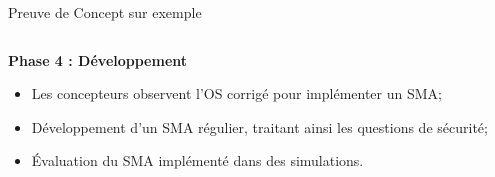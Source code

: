     \begin{frame}[fragile]{Preuve de Concept sur exemple}
    
    \begin{columns}
    
        \begin{column}{0.6\textwidth}
    
            \textbf{Phase 4 : Développement}
    
            \begin{itemize}
                \item Les concepteurs observent l'OS corrigé pour implémenter un SMA;
                \item Développement d'un SMA régulier, traitant ainsi les questions de sécurité;
                \item Évaluation du SMA implémenté dans des simulations.
            \end{itemize}
    
        \end{column}
    
        \begin{column}{0.4\textwidth}
            \centering
        \end{column}
    

\end{columns}
\end{frame}
